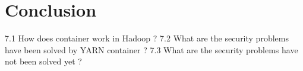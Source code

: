 \section{Conclusion}
\label{sec:conc}

\iffalse
Conclusions (don't summarize your work here. That's what the abstract
was for. Instead provide some philosophical ruminations of your work and
future possibilities, i.e., conclusions that you have arrived at as a
result of your work.)
\fi

7.1	How does container work in Hadoop ?
7.2	What are the security problems have been solved by YARN container ?
7.3	What are the security problems have not been solved yet ?
